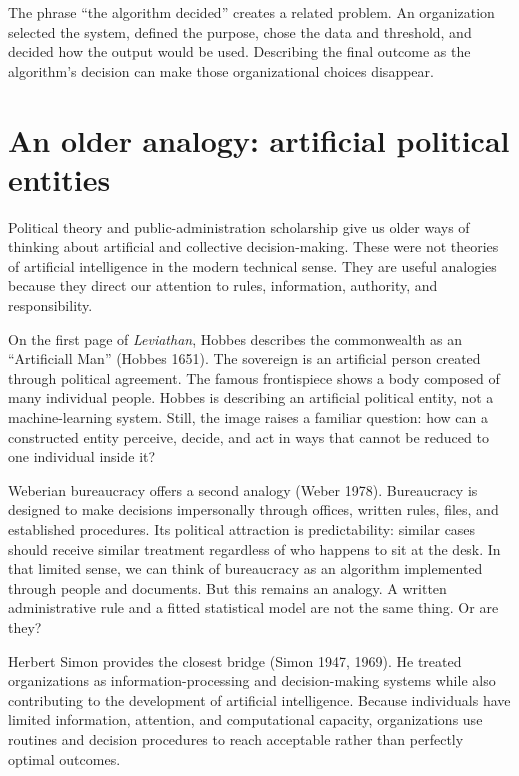 \documentclass[
  a4paper,
]{scrbook}
\begin{document}
The phrase ``the algorithm decided'' creates a related problem. An
organization selected the system, defined the purpose, chose the data
and threshold, and decided how the output would be used. Describing the
final outcome as the algorithm's decision can make those organizational
choices disappear.

\section{An older analogy: artificial political
entities}\label{an-older-analogy-artificial-political-entities}

Political theory and public-administration scholarship give us older
ways of thinking about artificial and collective decision-making. These
were not theories of artificial intelligence in the modern technical
sense. They are useful analogies because they direct our attention to
rules, information, authority, and responsibility.

On the first page of \emph{Leviathan}, Hobbes describes the commonwealth
as an ``Artificiall Man'' (Hobbes 1651). The sovereign is an artificial
person created through political agreement. The famous frontispiece
shows a body composed of many individual people. Hobbes is describing an
artificial political entity, not a machine-learning system. Still, the
image raises a familiar question: how can a constructed entity perceive,
decide, and act in ways that cannot be reduced to one individual inside
it?

Weberian bureaucracy offers a second analogy (Weber 1978). Bureaucracy
is designed to make decisions impersonally through offices, written
rules, files, and established procedures. Its political attraction is
predictability: similar cases should receive similar treatment
regardless of who happens to sit at the desk. In that limited sense, we
can think of bureaucracy as an algorithm implemented through people and
documents. But this remains an analogy. A written administrative rule
and a fitted statistical model are not the same thing. Or are they?

Herbert Simon provides the closest bridge (Simon 1947, 1969). He treated
organizations as information-processing and decision-making systems
while also contributing to the development of artificial intelligence.
Because individuals have limited information, attention, and
computational capacity, organizations use routines and decision
procedures to reach acceptable rather than perfectly optimal outcomes.
\end{document}
